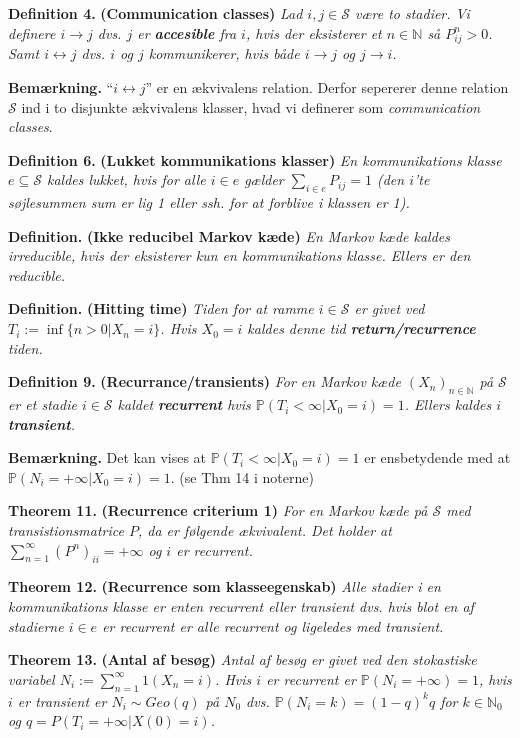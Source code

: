 \documentclass[
]{book}
\begin{document}
\textbf{Definition 4.} \textbf{(Communication classes)} \emph{Lad \(i,j\in\mathcal{S}\) være to stadier. Vi definere \(i\longrightarrow j\) dvs. \(j\) er \textbf{accesible} fra \(i\), hvis der eksisterer et \(n\in\mathbb{N}\) så \(P_{ij}^n>0\). Samt \(i\longleftrightarrow j\) dvs. \(i\) og \(j\) kommunikerer, hvis både \(i\longrightarrow j\) og \(j\longrightarrow i\).}

\textbf{Bemærkning.} ``\(i\longleftrightarrow j\)'' er en ækvivalens relation. Derfor sepererer denne relation \(\mathcal{S}\) ind i to disjunkte ækvivalens klasser, hvad vi definerer som \emph{communication classes}.

\textbf{Definition 6.} \textbf{(Lukket kommunikations klasser)} \emph{En kommunikations klasse \(e\subseteq \mathcal{S}\) kaldes lukket, hvis for alle \(i\in e\) gælder \(\sum_{i\in e}P_{ij}=1\) (den \(i\)'te søjlesummen sum er lig 1 eller ssh. for at forblive i klassen er 1).}

\textbf{Definition.} \textbf{(Ikke reducibel Markov kæde)} \emph{En Markov kæde kaldes irreducible, hvis der eksisterer kun en kommunikations klasse. Ellers er den reducible.}

\textbf{Definition.} \textbf{(Hitting time)} \emph{Tiden for at ramme \(i\in \mathcal{S}\) er givet ved \(T_i:=\inf\{n>0 \vert X_n=i\}\). Hvis \(X_0=i\) kaldes denne tid \textbf{return/recurrence} tiden.}

\textbf{Definition 9.} \textbf{(Recurrance/transients)} \emph{For en Markov kæde \((X_n)_{n\in\mathbb{N}}\) på \(\mathcal{S}\) er et stadie \(i\in\mathcal{S}\) kaldet \textbf{recurrent} hvis \(\mathbb{P}(T_i<\infty \vert X_0=i)=1\). Ellers kaldes \(i\) \textbf{transient}.}

\textbf{Bemærkning.} Det kan vises at \(\mathbb{P}(T_i<\infty \vert X_0=i)=1\) er ensbetydende med at \(\mathbb{P}(N_i=+\infty \vert X_0=i)=1\). (se Thm 14 i noterne)

\textbf{Theorem 11.} \textbf{(Recurrence criterium 1)} \emph{For en Markov kæde på \(\mathcal{S}\) med transistionsmatrice \(P\), da er følgende ækvivalent. Det holder at \(\sum_{n=1}^\infty (P^n)_{ii}=+\infty\) og \(i\) er recurrent.}

\textbf{Theorem 12.} \textbf{(Recurrence som klasseegenskab)} \emph{Alle stadier i en kommunikations klasse er enten recurrent eller transient dvs. hvis blot en af stadierne \(i\in e\) er recurrent er alle recurrent og ligeledes med transient.}

\textbf{Theorem 13.} \textbf{(Antal af besøg)} \emph{Antal af besøg er givet ved den stokastiske variabel \(N_i:=\sum_{n=1}^\infty 1(X_n=i)\). Hvis \(i\) er recurrent er \(\mathbb{P}(N_i=+\infty)=1\), hvis \(i\) er transient er \(N_i\sim Geo(q)\) på \(N_0\) dvs. \(\mathbb{P}(N_i=k)=(1-q)^kq\) for \(k\in\mathbb{N}_0\) og \(q=P(T_i=+\infty\vert X(0)=i)\).}
\end{document}
